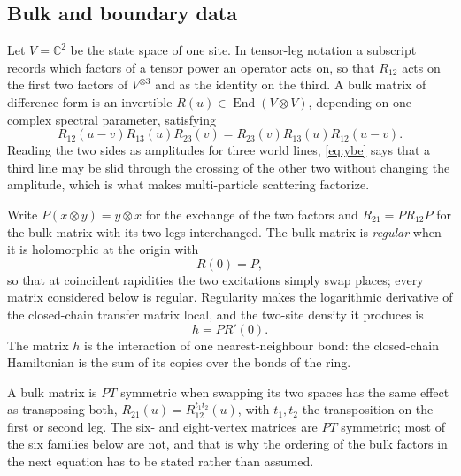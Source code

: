 \documentclass[11pt,reqno]{amsart}
\theoremstyle{plain}
\theoremstyle{definition}
\theoremstyle{remark}
\numberwithin{equation}{section}
\newcommand{\C}{\mathbb C}
\begin{document}
\subsection{Bulk and boundary data}

Let $V=\C^2$ be the state space of one site. In tensor-leg notation a subscript
records which factors of a tensor power an operator acts on, so that $R_{12}$
acts on the first two factors of $V^{\otimes3}$ and as the identity on the third.
A bulk matrix of difference form is an invertible
$R(u)\in\operatorname{End}(V\otimes V)$, depending on one complex spectral
parameter, satisfying
\begin{equation}
R_{12}(u-v)R_{13}(u)R_{23}(v)
=R_{23}(v)R_{13}(u)R_{12}(u-v).                 \label{eq:ybe}
\end{equation}
Reading the two sides as amplitudes for three world lines, \cref{eq:ybe} says
that a third line may be slid through the crossing of the other two without
changing the amplitude, which is what makes multi-particle scattering
factorize.

Write $P(x\otimes y)=y\otimes x$ for the exchange of the two factors and
$R_{21}=PR_{12}P$ for the bulk matrix with its two legs interchanged. The bulk
matrix is \emph{regular} when it is holomorphic at the origin with
\begin{equation}
R(0)=P,                                          \label{eq:regularity}
\end{equation}
so that at coincident rapidities the two excitations simply swap places; every
matrix considered below is regular. Regularity makes the logarithmic derivative
of the closed-chain transfer matrix local, and the two-site density it produces
is
\begin{equation}
h=P R'(0).                                      \label{eq:density}
\end{equation}
The matrix $h$ is the interaction of one nearest-neighbour bond: the closed-chain
Hamiltonian is the sum of its copies over the bonds of the ring.

A bulk matrix is $PT$ symmetric when swapping its two spaces has the same effect
as transposing both, $R_{21}(u)=R_{12}^{t_1t_2}(u)$, with $t_1,t_2$ the
transposition on the first or second leg. The six- and eight-vertex matrices are
$PT$ symmetric; most of the six families below are not, and that is why the
ordering of the bulk factors in the next equation has to be stated rather than
assumed.
\end{document}
